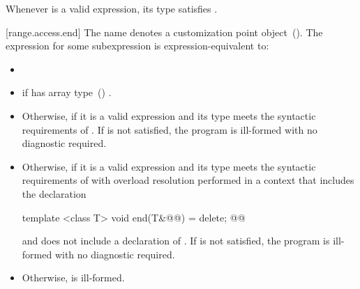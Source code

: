 \pnum
\enternote Whenever  is a valid expression, its
type satisfies . \exitnote

[range.access.end]{}
\pnum
The name  denotes a customization point
object~(). The expression
 for some subexpression  is expression-equivalent to:

\begin{itemize}
\item

\item
   if  has array
  type~() .

\item
  Otherwise, 
   if it is a valid expression and its
  type  meets the syntactic requirements of
  . If
   is not satisfied, the program is ill-formed with
  no diagnostic required.

\item
  Otherwise,  if it is a valid expression and
  its type  meets the syntactic requirements of
   with
  overload resolution performed in a context that includes the 
  declaration
  \begin{codeblock}
  template <class T> void end(T&@\added{\&}@) = delete;
  @@
  \end{codeblock}
  and does not include a declaration of . If 
  is not satisfied, the program is ill-formed with no diagnostic required.

\item
  Otherwise,  is ill-formed.
\end{itemize}


